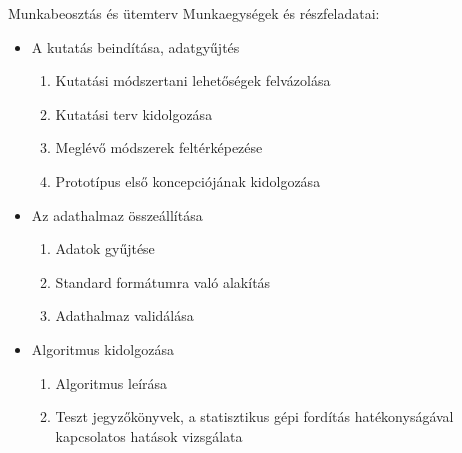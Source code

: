 \begin{frame}{Munkabeosztás és ütemterv}
Munkaegységek és részfeladatai:
\begin{itemize}
  \item<1-> {
    A kutatás beindítása, adatgyűjtés
    \begin{enumerate}
	    \item Kutatási módszertani lehetőségek felvázolása
	    \item Kutatási terv kidolgozása
	    \item Meglévő módszerek feltérképezése
	    \item Prototípus első koncepciójának kidolgozása
    \end{enumerate}
  }
  \item<2-> {   
    Az adathalmaz összeállítása
    \begin{enumerate}
        \item Adatok gyűjtése
        \item Standard formátumra való alakítás
        \item Adathalmaz validálása
    \end{enumerate}
  }
  \item<3-> {
    Algoritmus kidolgozása
    \begin{enumerate}
        \item Algoritmus leírása
        \item Teszt jegyzőkönyvek, a statisztikus gépi fordítás hatékonyságával kapcsolatos hatások vizsgálata
    \end{enumerate}
  }
  \end{itemize}
\end{frame}

